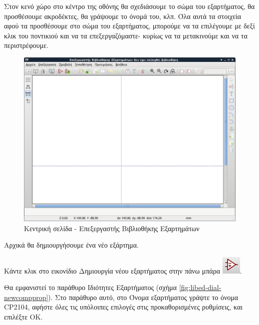 \documentclass[a4paper]{article}
\begin{document}
Στον κενό χώρο στο κέντρο της οθόνης θα σχεδιάσουμε το σώμα του εξαρτήματος, θα προσθέσουμε ακροδέκτες, θα γράψουμε το όνομά του, κλπ. Όλα αυτά τα στοιχεία αφού τα προσθέσουμε στο σώμα του εξαρτήματος, μπορούμε να τα επιλέγουμε με δεξί κλικ του ποντικιού και να τα επεξεργαζόμαστε- κυρίως να τα μετακινούμε και να τα περιστρέφουμε.

\begin{figure}
  \begin{center}
    \includegraphics[width=.9\textwidth]{img/libed-main-window.png}
    \caption{Kεντρική σελίδα - Επεξεργαστής Βιβλιοθήκης Εξαρτημάτων}
    \label{fig:libed-main-window}
  \end{center}
\end{figure}

Αρχικά θα δημιουργήσουμε ένα νέο εξάρτημα.

Κάντε κλικ στο εικονίδιο Δημιουργία νέου εξαρτήματος στην πάνω μπάρα \includegraphics[scale=.5]{img/libed-ico-newcomp.png}. 

Θα εμφανιστεί το παράθυρο Ιδιότητες Εξαρτήματος (σχήμα \ref{fig:libed-dial-newcompprop}). Στο παράθυρο αυτό, στο Όνομα εξαρτήματος γράψτε το όνομα CP2104, αφήστε όλες τις υπόλοιπες επιλογές στις προκαθορισμένες ρυθμίσεις, και επιλέξτε ΟΚ.
\end{document}
